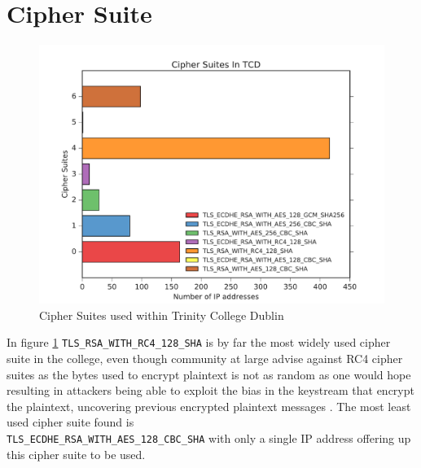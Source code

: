 \documentclass[a4wide,leqno,12pt]{report}
\begin{document}
\section{Cipher Suite}
\begin{figure}[H]
\centering
\includegraphics[scale=.5]{pdf_images/CipherSuitesInTCD}
\caption{Cipher Suites used within Trinity College Dublin}
\label{fig:cipherSuites}
\end{figure}

In figure \ref{fig:cipherSuites}
\texttt{TLS\_RSA\_WITH\_RC4\_128\_SHA} is by far the most widely used cipher suite in the college, even though community at large advise against RC4 cipher suites as the bytes used to encrypt plaintext is not as random as one would hope resulting in attackers being able to exploit the bias in the keystream that encrypt the plaintext, uncovering previous encrypted plaintext messages \cite{popov2015prohibiting}. The most least used cipher suite found is\\
\texttt{TLS\_ECDHE\_RSA\_WITH\_AES\_128\_CBC\_SHA} with only a single IP address offering up this cipher suite to be used.
\end{document}

